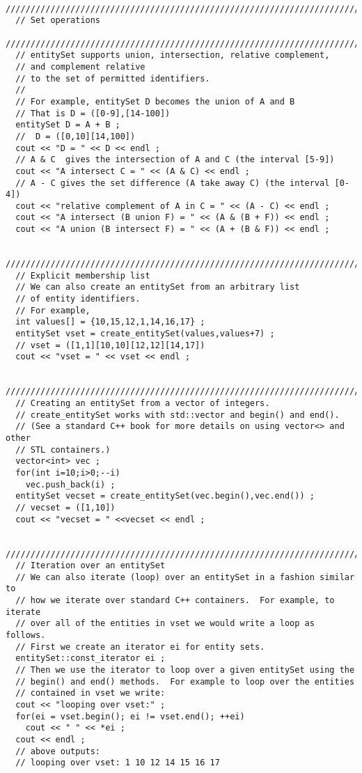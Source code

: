 \begin{verbatim}
  ////////////////////////////////////////////////////////////////////////////
  // Set operations
  ////////////////////////////////////////////////////////////////////////////
  // entitySet supports union, intersection, relative complement, 
  // and complement relative
  // to the set of permitted identifiers.
  //
  // For example, entitySet D becomes the union of A and B
  // That is D = ([0-9],[14-100])
  entitySet D = A + B ;
  //  D = ([0,10][14,100])
  cout << "D = " << D << endl ;
  // A & C  gives the intersection of A and C (the interval [5-9])
  cout << "A intersect C = " << (A & C) << endl ;
  // A - C gives the set difference (A take away C) (the interval [0-4])
  cout << "relative complement of A in C = " << (A - C) << endl ;
  cout << "A intersect (B union F) = " << (A & (B + F)) << endl ;  
  cout << "A union (B intersect F) = " << (A + (B & F)) << endl ;

  ////////////////////////////////////////////////////////////////////////////
  // Explicit membership list
  // We can also create an entitySet from an arbitrary list 
  // of entity identifiers.
  // For example,
  int values[] = {10,15,12,1,14,16,17} ;
  entitySet vset = create_entitySet(values,values+7) ;
  // vset = ([1,1][10,10][12,12][14,17])
  cout << "vset = " << vset << endl ;

  ////////////////////////////////////////////////////////////////////////////
  // Creating an entitySet from a vector of integers.
  // create_entitySet works with std::vector and begin() and end().
  // (See a standard C++ book for more details on using vector<> and other
  // STL containers.)
  vector<int> vec ;
  for(int i=10;i>0;--i)
    vec.push_back(i) ;
  entitySet vecset = create_entitySet(vec.begin(),vec.end()) ;
  // vecset = ([1,10])
  cout << "vecset = " <<vecset << endl ;

  ////////////////////////////////////////////////////////////////////////////
  // Iteration over an entitySet
  // We can also iterate (loop) over an entitySet in a fashion similar to
  // how we iterate over standard C++ containers.  For example, to iterate
  // over all of the entities in vset we would write a loop as follows.
  // First we create an iterator ei for entity sets.
  entitySet::const_iterator ei ;
  // Then we use the iterator to loop over a given entitySet using the
  // begin() and end() methods.  For example to loop over the entities
  // contained in vset we write:
  cout << "looping over vset:" ;
  for(ei = vset.begin(); ei != vset.end(); ++ei) 
    cout << " " << *ei ;
  cout << endl ;
  // above outputs:
  // looping over vset: 1 10 12 14 15 16 17


\end{verbatim}
